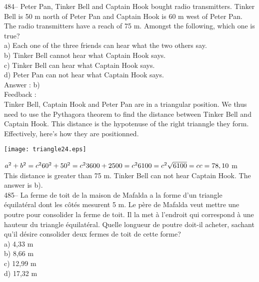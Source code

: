 \documentclass[letterpaper, 12pt]{article}
\begin{document}
484-- Peter Pan, Tinker Bell and Captain Hook bought radio transmitters. Tinker Bell is 50 m north of Peter Pan and Captain Hook is 60 m west of Peter Pan. The radio transmitters have a reach of 75 m. Amongst the following, which one is true?\\
a) Each one of the three friends can hear what the two others say.\\
b) Tinker Bell cannot hear what Captain Hook says.\\
c) Tinker Bell can hear what Captain Hook says.\\
d) Peter Pan can not hear what Captain Hook says.\\

Answer : b)\\

Feedback : \\
Tinker Bell, Captain Hook and Peter Pan are in a triangular position. We thus need to use the Pythagora  theorem to find the distance between Tinker Bell and Captain Hook. This distance is the hypotenuse of the right trianngle they form. Effectively, here's how they are positionned.\\
    \begin{center}
    \texttt{[image: triangle24.eps]}
    \end{center}

$a^{2}+b^{2}=c^{2}\\
60^{2}+50^{2}=c^{2}\\
3600+2500=c^{2}\\
6100=c^{2}\\
\sqrt{6100}=c\\
c=78,10$ m\\
This distance is greater than 75 m.  Tinker Bell can not hear Captain Hook. The answer is b).\\

485--  La ferme de toit de la maison de Mafalda a la forme d'un triangle
\'equilat\'eral dont les c\^ot\'es mesurent 5 m.  Le p\`ere de Mafalda veut
mettre une poutre pour consolider la ferme de toit.  Il la met \`a l'endroit
qui correspond \`a une hauteur du triangle \'equilat\'eral.  Quelle longueur
de poutre doit-il acheter, sachant qu'il d\'esire consolider deux fermes de
toit de cette forme?\\
a) 4,33 m\\
b) 8,66 m\\
c) 12,99 m\\
d) 17,32 m\\
\end{document}
